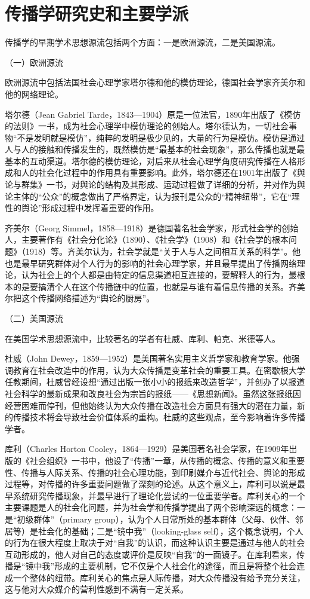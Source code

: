 \documentclass[UTF8,12pt]{ctexart}
\numberwithin{equation}{section} %
\numberwithin{figure}{section}
\numberwithin{table}{section}
\begin{document}
	\section{传播学研究史和主要学派}
	传播学的早期学术思想源流包括两个方面：一是欧洲源流，二是美国源流。
	
	（一）欧洲源流
	
	欧洲源流中包括法国社会心理学家塔尔德和他的模仿理论，德国社会学家齐美尔和他的网络理论。
	
	塔尔德（Jean Gabriel Tarde，1843—1904）原是一位法官，1890年出版了《模仿的法则》一书，成为社会心理学中模仿理论的创始人。塔尔德认为，一切社会事物“不是发明就是模仿”，纯粹的发明是极少见的，大量的行为是模仿。模仿是通过人与人的接触和传播发生的，既然模仿是“最基本的社会现象”，那么传播也就是最基本的互动渠道。塔尔德的模仿理论，对后来从社会心理学角度研究传播在人格形成和人的社会化过程中的作用具有重要影响。此外，塔尔德还在1901年出版了《舆论与群集》一书，对舆论的结构及其形成、运动过程做了详细的分析，并对作为舆论主体的“公众”的概念做出了严格界定，认为报刊是公众的“精神纽带”，它在“理性的舆论”形成过程中发挥着重要的作用。
	
	齐美尔（Georg Simmel，1858—1918）是德国著名社会学家，形式社会学的创始人，主要著作有《社会分化论》（1890）、《社会学》（1908）和《社会学的根本问题》（1918）等。齐美尔认为，社会学就是“关于人与人之间相互关系的科学”。他也是最早研究群体对个人行为的影响的社会心理学家，并且最早提出了传播网络理论，认为社会上的个人都是由特定的信息渠道相互连接的，要解释人的行为，最根本的是要搞清个人在这个传播链中的位置，也就是与谁有着信息传播的关系。齐美尔把这个传播网络描述为“舆论的厨房”。
	
	（二）美国源流
	
	在美国学术思想源流中，比较著名的学者有杜威、库利、帕克、米德等人。
	
	杜威（John Dewey，1859—1952）是美国著名实用主义哲学家和教育学家。他强调教育在社会改造中的作用，认为大众传播是变革社会的重要工具。在密歇根大学任教期间，杜威曾经设想“通过出版一张小小的报纸来改造哲学”，并创办了以报道社会科学的最新成果和改良社会为宗旨的报纸——《思想新闻》。虽然这张报纸因经营困难而停刊，但他始终认为大众传播在改造社会方面具有强大的潜在力量，新的传播技术将会导致社会价值体系的重构。杜威的这些观点，至今影响着许多传播学者。
	
	库利（Charles Horton Cooley，1864—1929）是美国著名社会学家，在1909年出版的《社会组织》一书中，他设了“传播”一章，从传播的概念、传播的意义和重要性、传播与人际关系、传播的社会心理功能，到印刷媒介与近代社会、舆论的形成过程等，对传播的许多重要问题做了深刻的论述。从这个意义上，库利可以说是最早系统研究传播现象，并最早进行了理论化尝试的一位重要学者。库利关心的一个主要课题是人的社会化问题，并为社会学和传播学提出了两个影响深远的概念：一是“初级群体”（primary group），认为个人日常所处的基本群体（父母、伙伴、邻居等）是社会化的基础；二是“镜中我”（looking-glass self），这个概念说明，个人的行为在很大程度上取决于对“自我”的认识，而这种认识主要是通过与他人的社会互动形成的，他人对自己的态度或评价是反映“自我”的一面镜子。在库利看来，传播是“镜中我”形成的主要机制，它不仅是个人社会化的途径，而且是将整个社会连成一个整体的纽带。库利关心的焦点是人际传播，对大众传播没有给予充分关注，这与他对大众媒介的营利性感到不满有一定关系。
	
\end{document}
